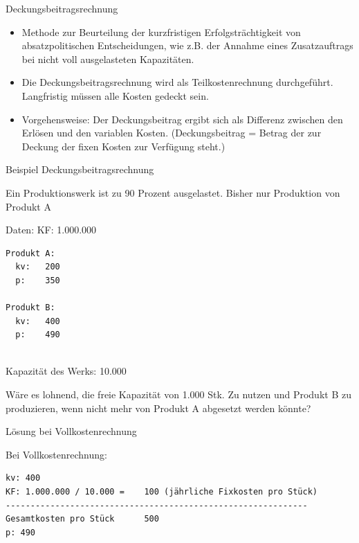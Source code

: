 \documentclass[12pt,ngerman,a4paper,ignorenonframetext,]{beamer}
\providecommand{\tightlist}{%
  \setlength{\itemsep}{0pt}\setlength{\parskip}{0pt}}
\begin{document}
\begin{frame}{Deckungsbeitragsrechnung}
\protect\hypertarget{deckungsbeitragsrechnung}{}

\begin{itemize}
\tightlist
\item
  Methode zur Beurteilung der kurzfristigen Erfolgsträchtigkeit von
  absatzpolitischen Entscheidungen, wie z.\thinspace{}B. der Annahme
  eines Zusatzauftrags bei nicht voll ausgelasteten Kapazitäten.
\item
  Die Deckungsbeitragsrechnung wird als Teilkostenrechnung durchgeführt.
  Langfristig müssen alle Kosten gedeckt sein.
\item
  Vorgehensweise: Der Deckungsbeitrag ergibt sich als Differenz zwischen
  den Erlösen und den variablen Kosten. (Deckungsbeitrag = Betrag der
  zur Deckung der fixen Kosten zur Verfügung steht.)
\end{itemize}

\end{frame}

\begin{frame}[fragile]{Beispiel Deckungsbeitragsrechnung}
\protect\hypertarget{beispiel-deckungsbeitragsrechnung}{}

Ein Produktionswerk ist zu 90 Prozent ausgelastet. Bisher nur Produktion
von Produkt A

Daten: KF: 1.000.000

\begin{verbatim}
Produkt A:  
  kv:   200  
  p:    350  
  
Produkt B:  
  kv:   400  
  p:    490  
  
\end{verbatim}

Kapazität des Werks: 10.000

Wäre es lohnend, die freie Kapazität von 1.000 Stk. Zu nutzen und
Produkt B zu produzieren, wenn nicht mehr von Produkt A abgesetzt werden
könnte?

\end{frame}

\begin{frame}[fragile]{Lösung bei Vollkostenrechnung}
\protect\hypertarget{losung-bei-vollkostenrechnung}{}

Bei Vollkostenrechnung:

\begin{verbatim}
kv: 400  
KF: 1.000.000 / 10.000 =    100 (jährliche Fixkosten pro Stück)  
-------------------------------------------------------------  
Gesamtkosten pro Stück      500  
p: 490  
\end{verbatim}

\end{frame}
\end{document}
